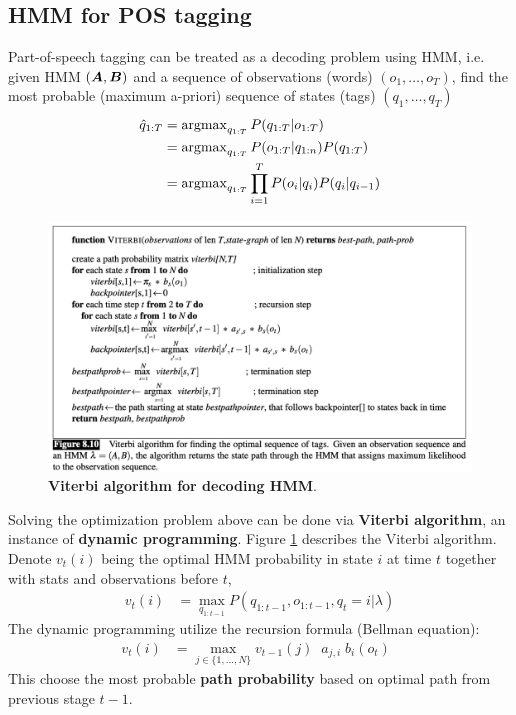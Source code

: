 \documentclass[11pt]{article}
\begin{document}
\subsection{HMM for POS tagging}
Part-of-speech tagging can be treated as a decoding problem using HMM, i.e. given HMM $(\boldsymbol{A},\boldsymbol{B})$ and a sequence of observations (words) $(o_1, \ldots, o_{T})$, find the most probable (maximum a-priori) sequence of states (tags) $(q_{1}, \ldots, q_{T})$ 
\begin{align*}
\hat{q}_{1:T} &= \operatorname{argmax}_{q_{1:T}}P(q_{1:T} | o_{1:T}) \\
&= \operatorname{argmax}_{q_{1:T}}P(o_{1:T} | q_{1:n})P(q_{1:T}) \\
&= \operatorname{argmax}_{q_{1:T}} \prod_{i=1}^{T}P(o_{i}|q_{i})P(q_{i}|q_{i-1})
\end{align*}

\begin{figure}
\begin{minipage}[t]{1\linewidth}
  \centering
  \centerline{\includegraphics[scale = 0.4]{viterbi_algor.png}}
\end{minipage}
\caption{\footnotesize{\textbf{Viterbi algorithm for decoding HMM}.}}
\label{fig: hmm_decode}
\end{figure}


Solving the optimization problem above can be done via \textbf{Viterbi algorithm}, an instance of \textbf{dynamic programming}. Figure \ref{fig: hmm_decode} describes the Viterbi algorithm. Denote $v_{t}(i)$ being the optimal HMM probability in state $i$ at time $t$ together with stats and observations before $t$, 
\begin{align*}
v_{t}(i) &= \max_{q_{1:t-1}} P(q_{1:t-1}, o_{1:t-1}, q_{t} = i | \lambda)
\end{align*}
The dynamic programming utilize the recursion formula (Bellman equation):
\begin{align}
v_{t}(i) &= \max_{j\in \{1,\ldots,N\}}v_{t-1}(j)\;\; a_{j,i} \;b_{i}(o_{t}) \;\; \label{eqn: bellman_eqn}
\end{align} This choose the most probable \textbf{path probability} based on optimal path from previous stage $t-1$.  
\end{document}
